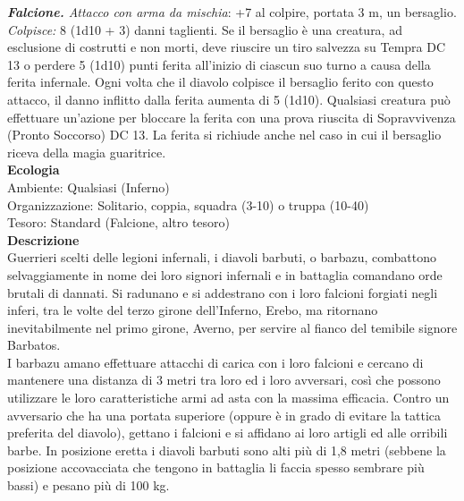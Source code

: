 \begin{multicols}{2}
\emph{\textbf{Falcione.} Attacco con arma da mischia}: +7 al colpire, portata 3 m, un bersaglio.
\emph{Colpisce:} 8 (1d10 + 3) danni taglienti. Se il bersaglio è una creatura, ad esclusione di costrutti e non morti, deve riuscire un tiro salvezza su Tempra DC  13 o perdere 5 (1d10) punti ferita all'inizio di ciascun suo turno a causa della ferita infernale. Ogni volta che il diavolo colpisce il bersaglio ferito con questo attacco, il  danno inflitto dalla ferita aumenta di 5 (1d10). Qualsiasi creatura può effettuare un'azione per bloccare la ferita con una prova riuscita di Sopravvivenza (Pronto Soccorso) DC  13. La ferita si richiude anche nel caso in cui il bersaglio riceva della magia guaritrice.\\
\textbf{Ecologia}\\
Ambiente: Qualsiasi (Inferno)\\
Organizzazione: Solitario, coppia, squadra (3-10) o truppa (10-40)\\
Tesoro: Standard (Falcione, altro tesoro)\\
\textbf{Descrizione}\\
Guerrieri scelti delle legioni infernali, i diavoli barbuti, o barbazu, combattono selvaggiamente in nome dei loro signori infernali e in battaglia comandano orde brutali di dannati. Si radunano e si addestrano con i loro falcioni forgiati negli inferi, tra le volte del terzo girone dell’Inferno, Erebo, ma ritornano inevitabilmente nel primo girone, Averno, per servire al fianco del temibile signore Barbatos.\\
I barbazu amano effettuare attacchi di carica con i loro falcioni e cercano di mantenere una distanza di 3 metri tra loro ed i loro avversari, così che possono utilizzare le loro caratteristiche armi ad asta con la massima efficacia. Contro un avversario che ha una portata superiore (oppure è in grado di evitare la tattica preferita del diavolo), gettano i falcioni e si affidano ai loro artigli ed alle orribili barbe. In posizione eretta i diavoli barbuti sono alti più di 1,8 metri (sebbene la posizione accovacciata che tengono in battaglia li faccia spesso sembrare più bassi) e pesano più di 100 kg.\\


\end{multicols}
